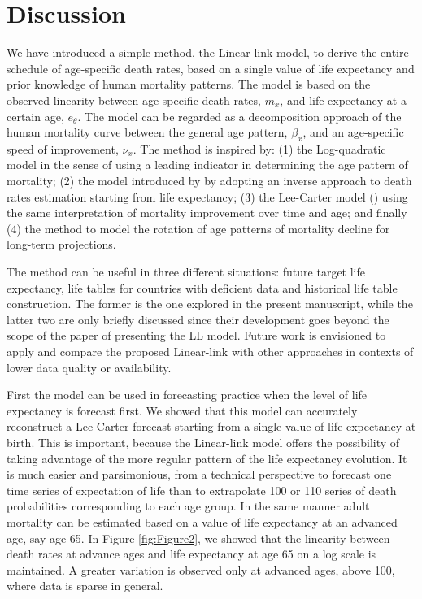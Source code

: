 \documentclass[risks,article,submit,moreauthors,pdftex]{Definitions/mdpi}
\begin{document}
\section{Discussion}\label{sec:Discussion}

We have introduced a simple method, the Linear-link model, to derive the entire schedule of age-specific death rates, based on a single value of life expectancy and prior knowledge of human mortality patterns. The model is based on the observed linearity between age-specific death rates, $m_x$, and life expectancy at a certain age, $e_\theta$. The model can be regarded as a decomposition approach of the human mortality curve between the general age pattern, $\beta_x$, and an age-specific speed of improvement, $\nu_x$. The method is inspired by: (1) the Log-quadratic model \citep{wilmoth2012} in the sense of using a leading indicator in determining the age pattern of mortality; (2) the model introduced by \cite{sevcikova2016} by adopting an inverse approach to death rates estimation starting from life expectancy; (3) the Lee-Carter model (\citeyear{lee1992}) using the same interpretation of mortality improvement over time and age; and finally (4) the \cite{li2013} method to model the rotation of age patterns of mortality decline for long-term projections.

The method can be useful in three different situations: future target life expectancy, life tables for countries with deficient data and historical life table construction. The former is the one explored in the present manuscript, while the latter two are only briefly discussed since their development goes beyond the scope of the paper of presenting the LL model. Future work is envisioned to apply and compare the proposed Linear-link with other approaches in contexts of lower data quality or availability.

First the model can be used in forecasting practice when the level of life expectancy is forecast first. We showed that this model can accurately reconstruct a Lee-Carter forecast starting from a single value of life expectancy at birth. This is important, because the Linear-link model offers the possibility of taking advantage of the more regular pattern of the life expectancy evolution. It is much easier and parsimonious, from a technical perspective to forecast one time series of expectation of life than to extrapolate 100 or 110 series of death probabilities corresponding to each age group. In the same manner adult mortality can be estimated based on a value of life expectancy at an advanced age, say age 65. In Figure \ref{fig:Figure2}, we showed that the linearity between death rates at advance ages and life expectancy at age 65 on a log scale is maintained. A greater variation is observed only at advanced ages, above 100, where data is sparse in general. 
\end{document}
